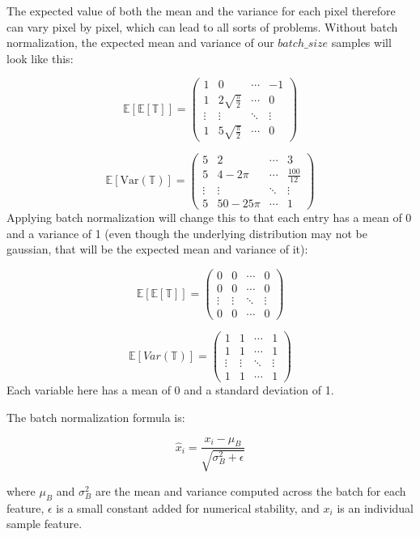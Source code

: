 \documentclass[12pt]{article}
\begin{document}
The expected value of both the mean and the variance for each pixel therefore can vary pixel by pixel, which can lead to all sorts of problems. Without batch normalization, the expected mean and variance of our \(batch\_size\) samples will look like this: 

\[\mathbb{E}[\mathbb{E}[\mathbb{T}]] =  \begin{pmatrix}
1 & 0  & \cdots & -1 \\
1  & 2 \sqrt{\frac{\pi}{2}} & \cdots  & 0 \\
\vdots & \vdots & \ddots & \vdots \\
1 & 5\sqrt{\frac{\pi}{2}}  & \cdots & 0 
\end{pmatrix}\]

\[ 
\mathbb{E}[\text{Var}(\mathbb{T})] = \begin{pmatrix}
5 & 2 & \cdots & 3 \\
5 & 4 - 2\pi & \cdots & \frac{100}{12} \\
\vdots & \vdots & \ddots & \vdots \\
5 & 50 - 25\pi & \cdots & 1 
\end{pmatrix}
\]
Applying batch normalization will change this to that each entry has a mean of 0 and a variance of 1 (even though the underlying distribution may not be gaussian, that will be the expected mean and variance of it):

\[\mathbb{E}[\mathbb{E}[\mathbb{T}]] =  \begin{pmatrix}
0 & 0  & \cdots & 0 \\
0  & 0 & \cdots  & 0 \\
\vdots & \vdots & \ddots & \vdots \\
0 & 0  & \cdots & 0 
\end{pmatrix}\]

\[\mathbb{E}[Var(\mathbb{T})] =  \begin{pmatrix}
1 & 1  & \cdots & 1 \\
1  & 1 & \cdots  & 1 \\
\vdots & \vdots & \ddots & \vdots \\
1 & 1  & \cdots & 1 
\end{pmatrix}\]
Each variable here has a mean of 0 and a standard deviation of 1. 

The batch normalization formula is:

\[ \hat{x}_i = \frac{x_i - \mu_B}{\sqrt{\sigma_B^2 + \epsilon}} \]

where \( \mu_B \) and \( \sigma_B^2 \) are the mean and variance computed across the batch for each feature, \( \epsilon \) is a small constant added for numerical stability, and \( x_i \) is an individual sample feature.
\end{document}
